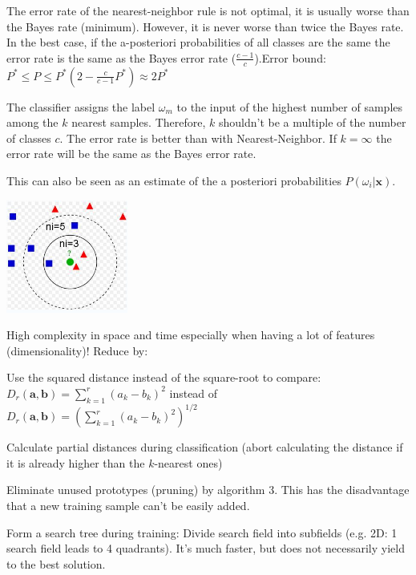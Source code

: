     The error rate of the nearest-neighbor rule is not optimal, it is usually worse than the Bayes 
    rate (minimum). However, it is never worse than twice the Bayes rate. 
    In the best case, if the a-posteriori probabilities of all classes are the same
    the error rate is the same as the Bayes error rate ($\frac{c-1}{c}$).\qquad Error bound: $P^*\leq P\leq P^*\left(2-\frac{c}{c-1}P^*\right)\approx 2P^*$ \\

  \begin{minipage}{14.5cm}
		The classifier assigns the label $\omega_m$ to the input of the highest number of samples among the $k$
		nearest samples. Therefore, $k$ shouldn't be a multiple of the number of classes $c$. 
		The error rate is better than with Nearest-Neighbor. If $k=\infty$
		the error rate will be the same as the Bayes error rate. 
		
		This can also be seen as an estimate of the a posteriori probabilities $P(\omega_i|\bm x)$.
		
  \end{minipage}
  \hfill
  \begin{minipage}{4cm}
	  	\includegraphics[width=4cm]{./images/kNearest.png}
  \end{minipage}
  
    High complexity in space and time especially when having a lot of features (dimensionality)!
    Reduce by: 
    \begin{aufzaehlung}
    	\item Use the squared distance instead of the square-root to compare: $D_r(\bm{a},\bm{b})=\sum\limits_{k=1}^r(a_k-b_k)^2$ 
    	instead of  $D_r(\bm{a},\bm{b})=\left(\sum\limits_{k=1}^r(a_k-b_k)^2\right)^{1/2}$
    	\item Calculate partial distances during classification (abort calculating the distance if it 
    	is already higher than the $k$-nearest ones)
    	\item Eliminate unused prototypes (pruning) by algorithm 3. This has the disadvantage that a new training sample can't be easily added.
    	\item Form a search tree during training: Divide search field into subfields (e.g. 2D: 
    	1 search field leads to 4 quadrants). It's much faster, but does not necessarily yield to the best solution.
    \end{aufzaehlung}
  
